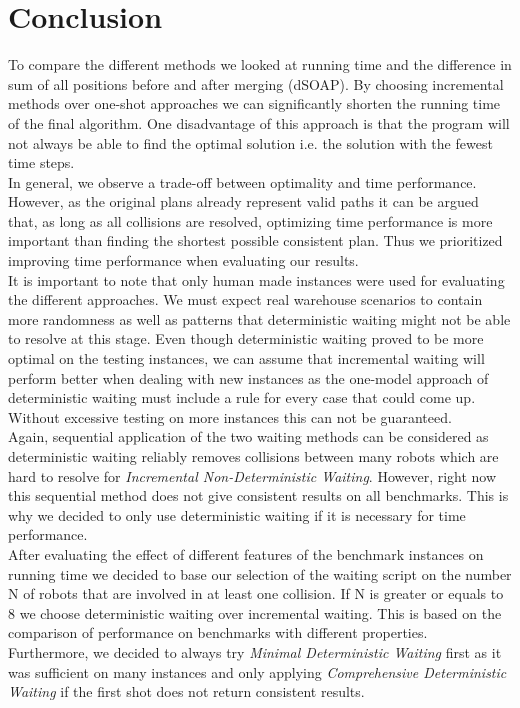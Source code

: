 \documentclass{llncs}
\begin{document}
\section{Conclusion}
To compare the different methods we looked at running time and the difference in sum of all positions before and after merging (dSOAP).
By choosing incremental methods over one-shot approaches we can significantly shorten the running time of the final algorithm. One disadvantage of this approach is that the program will not always be able to find the optimal solution i.e. the solution with the fewest time steps.\\
In general, we observe a trade-off between optimality and time performance. However, as the original plans already represent valid paths it can be argued that, as long as all collisions are resolved, optimizing time performance is more important than finding the shortest possible consistent plan.
Thus we prioritized improving time performance when evaluating our results.\\
It is important to note that only human made instances were used for evaluating the different approaches. We must expect real warehouse scenarios to contain more randomness as well as patterns that deterministic waiting might not be able to resolve at this stage. Even though deterministic waiting proved to be more optimal on the testing instances, we can assume that incremental waiting will perform better when dealing with new instances as the one-model approach of deterministic waiting must include a rule for every case that could come up.
Without excessive testing on more instances this can not be guaranteed.\\
Again, sequential application of the two waiting methods can be considered as deterministic waiting reliably removes collisions between many robots which are hard to resolve for \emph{Incremental Non-Deterministic Waiting}. However, right now this sequential method does not give consistent results on all benchmarks. 
This is why we decided to only use deterministic waiting if it is necessary for time performance. \\
After evaluating the effect of different features of the benchmark instances on running time we decided to base our selection of the waiting script on the number N of robots that are involved in at least one collision. If N is greater or equals to 8 we choose deterministic waiting over incremental waiting. This is based on the comparison of performance on benchmarks with different properties.
Furthermore, we decided to always try \emph{Minimal Deterministic Waiting} first as it was sufficient on many instances and only applying \emph{Comprehensive Deterministic Waiting} if the first shot does not return consistent results.
\end{document}
